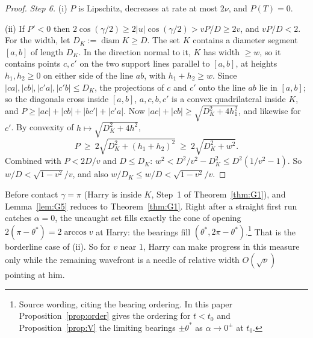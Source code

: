 \begin{proof}
\emph{Step 6.} (i) $P$ is Lipschitz, decreases at rate at most $2\nu$, and $P(T)=0$.

(ii) If $P'<0$ then $2\cos(\gamma/2)\ge2|u|\cos(\gamma/2)>vP/D\ge2v$, and $vP/D<2$. For the width, let $D_K:=\operatorname{diam}K\ge D$. The set $K$
contains a diameter segment $[a,b]$ of length $D_K$. In the direction normal to it, $K$ has width $\ge w$, so it contains points
$c,c'$ on the two support lines parallel to $[a,b]$, at heights $h_1,h_2\ge0$ on either side of the line $ab$, with $h_1+h_2\ge w$.
Since $|ca|,|cb|,|c'a|,|c'b|\le D_K$, the projections of $c$ and $c'$ onto the line $ab$ lie in $[a,b]$; so the diagonals cross inside
$[a,b]$, $a,c,b,c'$ is a convex quadrilateral inside $K$, and $P\ge|ac|+|cb|+|bc'|+|c'a|$. Now $|ac|+|cb|\ge\sqrt{D_K^2+4h_1^2}$, and
likewise for $c'$. By convexity of $h\mapsto\sqrt{D_K^2+4h^2}$,
\[
P\ \ge\ 2\sqrt{D_K^2+(h_1+h_2)^2}\ \ge\ 2\sqrt{D_K^2+w^2}.
\]
Combined with $P<2D/v$ and $D\le D_K$: $w^2<D^2/v^2-D_K^2\le D^2(1/v^2-1)$. So $w/D<\sqrt{1-v^2}/v$, and also $w/D_K\le w/D<\sqrt{1-v^2}/v$.
\end{proof}

\begin{remark}
Before contact $\gamma=\pi$ (Harry is inside $K$, Step~1 of Theorem~\ref{thm:G1}), and Lemma~\ref{lem:G5} reduces to
Theorem~\ref{thm:G1}. Right after a straight first run catches $\alpha=0$, the uncaught set fills exactly the cone of opening
$2(\pi-\theta^*)=2\arccos v$ at Harry: the bearings fill $(\theta^*,2\pi-\theta^*)$.\footnote{Source wording, citing the bearing
ordering. In this paper Proposition~\ref{prop:order} gives the ordering for $t<t_0$ and Proposition~\ref{prop:V} the limiting bearings
$\pm\theta^*$ as $\alpha\to0^\pm$ at $t_0$.} That is the borderline case of (ii). So for $v$ near $1$, Harry can make progress in this
measure only while the remaining wavefront is a needle of relative width $O(\sqrt\nu)$ pointing at him.
\end{remark}

